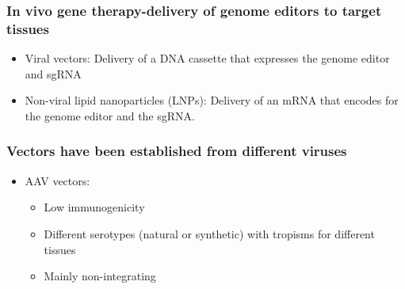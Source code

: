 \begin{itemize}
\begin{itemize}
\subsubsection{In vivo gene therapy-delivery of genome editors to target tissues}
\begin{itemize}
    \item Viral vectors: Delivery of a DNA cassette that expresses the genome editor and sgRNA
    \item Non-viral lipid nanoparticles (LNPs): Delivery of an mRNA that encodes for the genome editor and the sgRNA.
\end{itemize}
\subsubsection{Vectors have been established from different viruses}
\begin{itemize}
    \item AAV vectors:
    \begin{itemize}
        \item Low immunogenicity
        \item Different serotypes (natural or synthetic) with tropisms for different tissues
        \item Mainly non-integrating
    \end{itemize}
\end{itemize}


\end{itemize}
\end{itemize}
